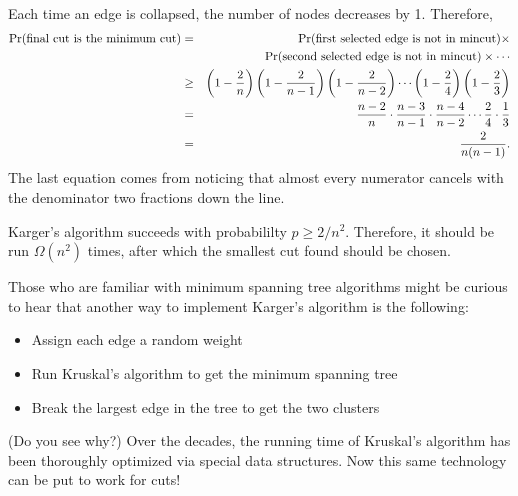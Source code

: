 \documentclass{report}
\theoremstyle{plain}
\theoremstyle{definition}
\newcommand{\pr}{\mbox{\rm Pr}}
\begin{document}
Each time an edge is collapsed, the number of nodes decreases by 1. Therefore,
\begin{eqnarray*}
\pr(\mbox{final cut is the minimum cut})
& = &
\pr(\mbox{first selected edge is not in mincut}) \times \\
& & \pr(\mbox{second selected edge is not in mincut}) \times \cdots \\
& \geq & 
\left( 1 - \frac{2}{n} \right) \left( 1 - \frac{2}{n-1} \right) 
\left( 1 - \frac{2}{n-2} \right) \cdots \left( 1 - \frac{2}{4} \right) 
\left( 1 - \frac{2}{3} \right) \\
& = & 
\frac{n-2}{n} \cdot \frac{n-3}{n-1} \cdot \frac{n-4}{n-2} \cdots \frac{2}{4} \cdot 
\frac{1}{3} \\
& = & 
\frac{2}{n(n-1)} .
\end{eqnarray*}
The last equation comes from noticing that almost every numerator cancels with the 
denominator two fractions down the line.

Karger's algorithm succeeds with probabililty $p \geq 2/n^2$. Therefore,
it should be run $\Omega(n^2)$ times, after which the smallest cut found should
be chosen.

Those who are familiar with minimum spanning tree algorithms might be curious to
hear that another way to implement Karger's algorithm is the following:
\begin{itemize}
\item Assign each edge a random weight
\item Run Kruskal's algorithm to get the minimum spanning tree
\item Break the largest edge in the tree to get the two clusters
\end{itemize}
(Do you see why?) Over the decades, the running time of Kruskal's algorithm has 
been thoroughly optimized via special data structures. Now this same technology 
can be put to work for cuts!
\end{document}
